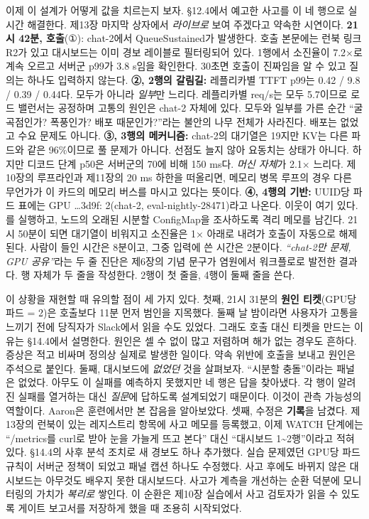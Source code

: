 이제 이 설계가 어떻게 값을 치르는지 보자. §12.4에서 예고한 사고를 이 네 행으로 실시간 해결한다. 제13장 마지막 상자에서 \textit{라이브로} 보여 주겠다고 약속한 시연이다. \textbf{21시 42분, 호출}(①): chat-2에서 QueueSustained가 발생한다. 호출 본문에는 런북 링크 R2가 있고 대시보드는 이미 경보 레이블로 필터링되어 있다. 1행에서 소진율이 7.2×로 계속 오르고 서버군 p99가 3.8 s임을 확인한다. 30초면 호출이 진짜임을 알 수 있고 질의는 하나도 입력하지 않는다. \textbf{②, 2행의 갈림길:} 레플리카별 TTFT p99는 0.42 / 9.8 / 0.39 / 0.44다. 모두가 아니라 \textit{일부}만 느리다. 레플리카별 req/s는 모두 5.7이므로 로드 밸런서는 공정하며 고통의 원인은 chat-2 자체에 있다. 모두와 일부를 가른 순간 “굴곡점인가? 폭풍인가? 배포 때문인가?”라는 불안의 나무 전체가 사라진다. 배포는 없었고 수요 문제도 아니다. \textbf{③, 3행의 메커니즘:} chat-2의 대기열은 19지만 KV는 다른 파드와 같은 96\%이므로 풀 문제가 아니다. 선점도 늘지 않아 요동치는 상태가 아니다. 하지만 디코드 단계 p50은 서버군의 70에 비해 150 ms다. \textit{머신 자체}가 2.1× 느리다. 제10장의 루프라인과 제11장의 20 ms 하한을 떠올리면, 메모리 병목 루프의 경우 다른 무언가가 이 카드의 메모리 버스를 마시고 있다는 뜻이다. \textbf{④, 4행의 기반:} UUID당 파드 표에는 GPU …3d9f: 2(chat-2, eval-nightly-28471)라고 나온다. 이웃이 여기 있다. 를 실행하고, 노드의 오래된 시분할 ConfigMap을 조사하도록 격리 메모를 남긴다. 21시 50분이 되면 대기열이 비워지고 소진율은 1× 아래로 내려가 호출이 자동으로 해제된다. 사람이 들인 시간은 8분이고, 그중 입력에 쓴 시간은 2분이다. \textit{“chat-2만 문제, GPU 공유”}라는 두 줄 진단은 제6장의 기념 문구가 염원에서 워크플로로 발전한 결과다. 행 자체가 두 줄을 작성한다. 2행이 첫 줄을, 4행이 둘째 줄을 쓴다.

이 상황을 재현할 때 유의할 점이 세 가지 있다. 첫째, 21시 31분의 \textbf{원인 티켓}(GPU당 파드 = 2)은 호출보다 11분 먼저 범인을 지목했다. 둘째 날 밤이라면 사용자가 고통을 느끼기 전에 당직자가 Slack에서 읽을 수도 있었다. 그래도 호출 대신 티켓을 만드는 이유는 §14.4에서 설명한다. 원인은 셀 수 없이 많고 저렴하며 해가 없는 경우도 흔하다. 증상은 적고 비싸며 정의상 실제로 발생한 일이다. 약속 위반에 호출을 보내고 원인은 주석으로 붙인다. 둘째, 대시보드에 \textit{없었던} 것을 살펴보자. “시분할 충돌”이라는 패널은 없었다. 아무도 이 실패를 예측하지 못했지만 네 행은 답을 찾아냈다. 각 행이 알려진 실패를 열거하는 대신 \textit{질문}에 답하도록 설계되었기 때문이다. 이것이 관측 가능성의 역할이다. Aaron은 훈련에서만 본 잡음을 알아보았다. 셋째, 수정은 \textbf{기록}을 남겼다. 제13장의 런북이 있는 레지스트리 항목에 사고 메모를 등록했고, 이제 WATCH 단계에는 “/metrics를 curl로 받아 눈을 가늘게 뜨고 본다” 대신 “대시보드 1\textasciitilde{}2행”이라고 적혀 있다. §14.4의 사후 분석 조치로 새 경보도 하나 추가했다. 실습 문제였던 GPU당 파드 규칙이 서버군 정책이 되었고 패널 캡션 하나도 수정했다. 사고 후에도 바뀌지 않은 대시보드는 아무것도 배우지 못한 대시보드다. 사고가 계측을 개선하는 순환 덕분에 모니터링의 가치가 \textit{복리로} 쌓인다. 이 순환은 제10장 실습에서 사고 검토자가 읽을 수 있도록 게이트 보고서를 저장하게 했을 때 조용히 시작되었다.

